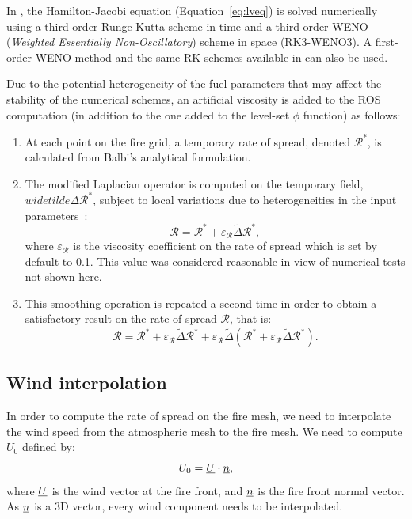 \medskip

In \Blaze, the Hamilton-Jacobi equation (Equation~\ref{eq:lveq}) is solved numerically using a third-order Runge-Kutta scheme in time and a third-order WENO (\emph{Weighted Essentially Non-Oscillatory}) scheme in space (RK3-WENO3). A first-order WENO method and the same RK schemes available in \MNH{} can also be used.

\medskip

Due to the potential heterogeneity of the fuel parameters that may affect the stability of the numerical schemes, an artificial viscosity is added to the ROS computation (in addition to the one added to the level-set $\phi$ function) as follows:
\begin{enumerate}
	\item At each point on the fire grid, a temporary rate of spread, denoted $\mathcal R^*$, is calculated from Balbi's analytical formulation.
	\item The modified Laplacian operator is computed on the temporary field, $widetilde \Delta \mathcal R^*$, subject to local variations due to heterogeneities in the input parameters~:
\begin{equation}
\mathcal R = \mathcal R^* + \varepsilon_{\mathcal R} \widetilde \Delta \mathcal R^*,
\end{equation}
where $\varepsilon_{\mathcal R}$ is the viscosity coefficient on the rate of spread which is set by default to 0.1. This value was considered reasonable in view of numerical tests not shown here.
	\item This smoothing operation is repeated a second time in order to obtain a satisfactory result on the rate of spread $\mathcal R$, that is:
\begin{equation}
  \mathcal R = \mathcal R^* + \varepsilon_{\mathcal R} \widetilde \Delta \mathcal R^* + \varepsilon_{\mathcal R}  \widetilde \Delta \left ( \mathcal R^* + \varepsilon_{\mathcal R} \widetilde \Delta \mathcal R^* \right ).
\end{equation}
\end{enumerate}

\subsection{Wind interpolation}

In order to compute the rate of spread on the fire mesh, we need to interpolate the wind speed from the atmospheric mesh to the fire mesh. We need to compute $U_0$ defined by:
\begin{equation}
  U_0 = \underline{U} \cdot \underline{n},
\end{equation}
where $\underline{U}$ is the wind vector at the fire front, and $\underline{n}$ is the fire front normal vector. As $\underline{n}$ is a 3D vector, every wind component needs to be interpolated.

